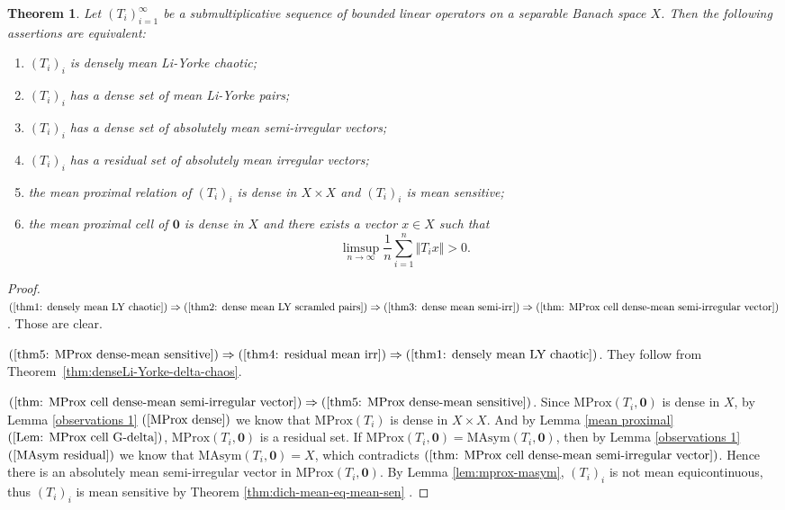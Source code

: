\documentclass[12pt,a4paper]{amsart}
\theoremstyle{definition}
\theoremstyle{plain}
\newtheorem{thm}[defn]{Theorem}
\begin{document}
\begin{thm}\label{thm:equi-dmlyc}
    Let $(T_i)_{i=1}^{\infty}$ be a submultiplicative sequence of bounded linear operators on a separable Banach space $X$.
    Then the following assertions are equivalent:
    \begin{enumerate}
        \item \label{thm1: densely mean LY chaotic}
             $(T_i)_{i}$ is densely mean Li-Yorke chaotic;
        \item \label{thm2: dense mean LY scramled pairs}
             $(T_i)_{i}$ has a dense set of mean Li-Yorke pairs;
        \item \label{thm3: dense mean semi-irr}
             $(T_i)_{i}$ has a dense set of absolutely mean semi-irregular vectors;
        \item \label{thm4: residual mean irr}
              $(T_i)_{i}$ has a residual set of absolutely mean irregular vectors;
        \item \label{thm5: MProx dense-mean sensitive}
              the mean proximal relation of $(T_i)_{i}$ is dense in $X\times X$ and $(T_i)_{i}$ is mean sensitive;
        \item \label{thm: MProx cell dense-mean semi-irregular vector}
        the mean proximal cell of $\mathbf{0}$ is dense in $X$ and there exists a vector $x\in X$ such that
              \[
                  \limsup_{n\to\infty}\frac{1}{n}\sum_{i=1}^{n}\Vert T_ix\Vert>0.
              \]
    \end{enumerate}
\end{thm}
\begin{proof}
     $(\ref{thm1: densely mean LY chaotic})  \Rightarrow (\ref{thm2: dense mean LY scramled pairs})  \Rightarrow (\ref{thm3: dense mean semi-irr})  \Rightarrow  (\ref{thm: MProx cell dense-mean semi-irregular vector}) $.  Those are clear.

    $(\ref{thm5: MProx dense-mean sensitive})   \Rightarrow (\ref{thm4: residual mean irr})    \Rightarrow  (\ref{thm1: densely mean LY chaotic}) $.  They follow from Theorem~\ref{thm:denseLi-Yorke-delta-chaos}.

     $(\ref{thm: MProx cell dense-mean semi-irregular vector})  \Rightarrow  (\ref{thm5: MProx dense-mean sensitive})$. Since $\mathrm{MProx}(T_i,\mathbf{0})$ is dense in $X$, by Lemma \ref{observations 1} $(\ref{MProx dense})$ we know that $\mathrm{MProx}(T_i)$ is dense in $X\times X$. And by Lemma \ref{mean proximal} $(\ref{Lem: MProx cell G-delta})$, $\mathrm{MProx}(T_i,\mathbf{0})$ is a residual set. If $\mathrm{MProx}(T_i,\mathbf{0})=\mathrm{MAsym}(T_i,\mathbf{0})$, then by Lemma \ref{observations 1} $(\ref{MAsym residual})$ we know that $\mathrm{MAsym}(T_i,\mathbf{0})=X$, which contradicts $(\ref{thm: MProx cell dense-mean semi-irregular vector})$. Hence there is an absolutely mean semi-irregular vector in $\mathrm{MProx}(T_i,\mathbf{0})$. By Lemma \ref{lem:mprox-masym}, $(T_i)_{i}$ is not mean equicontinuous, thus $(T_i)_{i}$ is mean sensitive by Theorem \ref{thm:dich-mean-eq-mean-sen} .
\end{proof}
\end{document}
